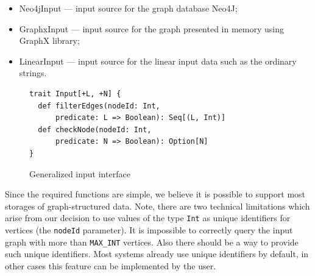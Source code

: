 
\begin{itemize}
    \item Neo4jInput --- input source for the graph database Neo4J;
    \item GraphxInput --- input source for the graph presented in memory using GraphX library;
    \item LinearInput --- input source for the linear input data such as the ordinary strings.
\end{itemize}

\begin{figure}[h]
\begin{lstlisting}
trait Input[+L, +N] {
  def filterEdges(nodeId: Int, 
      predicate: L => Boolean): Seq[(L, Int)]
  def checkNode(nodeId: Int, 
      predicate: N => Boolean): Option[N]
}

\end{lstlisting}
\caption{Generalized input interface}
\label{fig:input}
\end{figure}

Since the required functions are simple, we believe it is possible to support most storages of graph-structured data.
Note, there are two technical limitations which arise from our decision to use values of the type \lstinline{Int} as unique identifiers for vertices (the \lstinline{nodeId} parameter).
It is impossible to correctly query the input graph with more than \lstinline{MAX_INT} vertices. 
Also there should be a way to provide such unique identifiers. Most systems already use unique identifiers by default, in other cases this feature can be implemented by the user.




